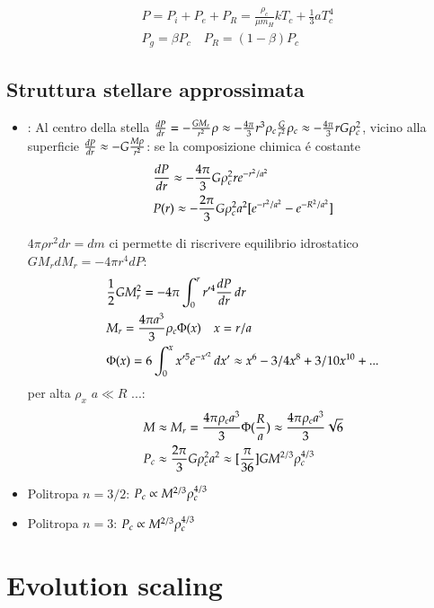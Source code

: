 \begin{align*}
&P=P_i+P_e+P_R=\frac{\rho_c}{\mu m_H}kT_c+\frac{1}{3}aT_c^4\\
&P_g=\beta P_c\quad P_R=(1-\beta)P_c
\end{align*}

\subsection{Struttura stellare approssimata}

\begin{itemize}
\item {}:
Al centro della stella $\TDy{r}{P}=-\frac{GM_r}{r^2}\rho\approx-\frac{4\pi}{3}r^3\rho_c\frac{G}{r^2}\rho_c\approx-\frac{4\pi}{3}rG\rho_c^2$, vicino alla superficie $\TDy{r}{P}\approx-G\frac{M\rho}{r^2}$: se la composizione chimica \'e costante
\begin{align*}
&\TDy{r}{P}\approx-\frac{4\pi}{3}G\rho_c^2r\exp{-r^2/a^2}\\
&P(r)\approx-\frac{2\pi}{3}G\rho_c^2a^2[\exp{-r^2/a^2}-\exp{-R^2/a^2}]
\end{align*}

$4\pi\rho r^2dr=dm$ ci permette di riscrivere equilibrio idrostatico $GM_rdM_r=-4\pi r^4dP$:
\begin{align*}
&\frac{1}{2}GM_r^2=-4\pi\int_0^rr'^4\TDy{r}{P}\,dr\\
&M_r=\frac{4\pi a^3}{3}\rho_c\Phi(x)\quad x=r/a\\
&\Phi(x)=6\int_0^xx'^5\exp{-x'^2}\,dx'\approx x^6-3/4x^8+3/10x\expy{10}+...
\end{align*}
per alta $\rho_x$ $a\ll R$ ...:
\begin{align*}
&M\approx M_r=\frac{4\pi\rho_ca^3}{3}\Phi(\frac{R}{a})\approx\frac{4\pi\rho_ca^3}{3}\sqrt{6}\\
&P_c\approx\frac{2\pi}{3}G\rho_c^2a^2\approx[\frac{\pi}{36}]GM\expy{2/3}\rho_c\expy{4/3}
\end{align*}

\item Politropa $n=3/2$: $P_c\propto M\expy{2/3}\rho_c\expy{4/3}$

\item Politropa $n=3$: $P_c\propto M\expy{2/3}\rho_c\expy{4/3}$

\end{itemize}

\section{Evolution scaling}

